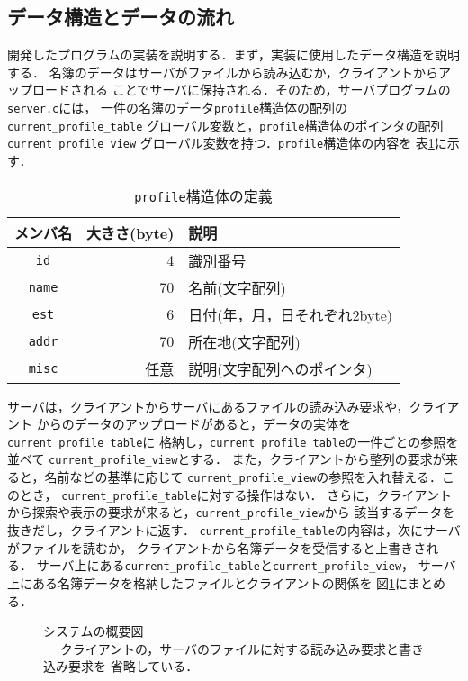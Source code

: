 \documentclass[a4j,10pt]{jarticle}
\begin{document}
\subsection{データ構造とデータの流れ}
開発したプログラムの実装を説明する．まず，実装に使用したデータ構造を説明する．
名簿のデータはサーバがファイルから読み込むか，クライアントからアップロードされる
ことでサーバに保持される．そのため，サーバプログラムの\verb|server.c|には，
一件の名簿のデータ\verb|profile|構造体の配列の\verb|current_profile_table|
グローバル変数と，\verb|profile|構造体のポインタの配列\verb|current_profile_view|
グローバル変数を持つ．\verb|profile|構造体の内容を
表\ref{tab:definition-of-profile}に示す．
\begin{table}
  \centering
  \cprotect\caption{\verb|profile|構造体の定義}
  \label{tab:definition-of-profile}
  \begin{tabular}{crl}
    \hline
    メンバ名 & 大きさ(byte) & 説明 \\ \hline \hline
    \verb|id| & 4 & 識別番号 \\ \hline
    \verb|name| & 70 & 名前(文字配列) \\ \hline
    \verb|est| & 6 & 日付(年，月，日それぞれ2byte) \\ \hline
    \verb|addr| & 70 & 所在地(文字配列) \\ \hline
    \verb|misc| & 任意 & 説明(文字配列へのポインタ) \\ \hline
  \end{tabular}
\end{table}
サーバは，クライアントからサーバにあるファイルの読み込み要求や，クライアント
からのデータのアップロードがあると，データの実体を\verb|current_profile_table|に
格納し，\verb|current_profile_table|の一件ごとの参照を並べて
\verb|current_profile_view|とする．
また，クライアントから整列の要求が来ると，名前などの基準に応じて
\verb|current_profile_view|の参照を入れ替える．このとき，
\verb|current_profile_table|に対する操作はない．
さらに，クライアントから探索や表示の要求が来ると，\verb|current_profile_view|から
該当するデータを抜きだし，クライアントに返す．
\verb|current_profile_table|の内容は，次にサーバがファイルを読むか，
クライアントから名簿データを受信すると上書きされる．
サーバ上にある\verb|current_profile_table|と\verb|current_profile_view|，
サーバ上にある名簿データを格納したファイルとクライアントの関係を
図\ref{fig:table-and-view}にまとめる．
\begin{figure}
  \centering
  \def\svgwidth{\columnwidth}
  
  \caption{システムの概要図 \\　\footnotesize{
      クライアントの，サーバのファイルに対する読み込み要求と書き込み要求を
      省略している．}}
  \label{fig:table-and-view}
\end{figure}
\end{document}
